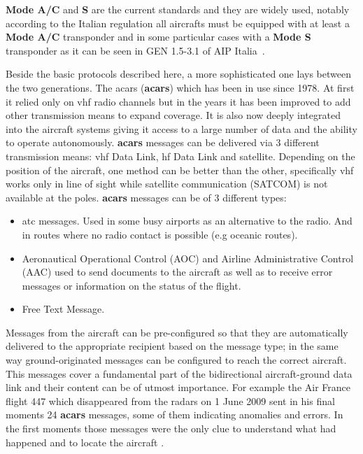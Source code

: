 \documentclass[../main.tex]{subfiles}
\begin{document}
\textbf{Mode A/C} and \textbf{S} are the current standards and they are widely used, notably according to the Italian regulation all aircrafts must be equipped with at least a \textbf{Mode A/C} transponder and in some particular cases with a \textbf{Mode S} transponder as it can be seen in GEN 1.5-3.1 of AIP Italia~\cite{itareg}.

Beside the basic protocols described here, a more sophisticated one lays between
the two generations.
The \acrlong{acars} (\textbf{\acrshort{acars}}) which has been in use since
1978. At first it relied only on \acrshort{vhf} radio channels but in the years
it has been improved to add other transmission means to expand coverage. It is
also now deeply integrated into the aircraft systems giving it access to a large
number of data and the ability to operate autonomously.
\textbf{\acrshort{acars}} messages can be delivered via 3 different transmission
means: \acrshort{vhf} Data Link, \acrshort{hf} Data Link and satellite.
Depending on the position of the aircraft, one method can be better than the
other, specifically \acrshort{vhf} works only in line of sight while satellite
communication (SATCOM) is not available at the poles. \textbf{\acrshort{acars}}
messages can be of 3 different types:
\begin{itemize}
  \item \acrlong{atc} messages. Used in some busy airports as an alternative to the radio. And in routes where no radio contact is possible (e.g oceanic routes).
  \item Aeronautical Operational Control (AOC) and Airline Administrative Control (AAC) used to send documents to the aircraft as well as to receive error messages or information on the status of the flight.
  \item Free Text Message.
\end{itemize}
Messages from the aircraft can be pre-configured so that they are automatically delivered to the appropriate recipient based on the message type; in the same way ground-originated messages can be configured to reach the correct aircraft. This messages cover a fundamental part of the bidirectional aircraft-ground data link and their content can be of utmost importance.
For example the Air France flight 447 which disappeared from the radars on 1 June 2009 sent in his final moments 24 \textbf{\acrshort{acars}} messages, some of them indicating anomalies and errors. In the first moments those messages were the only clue to understand what had happened and to locate the aircraft \cite{af447}.
\end{document}
